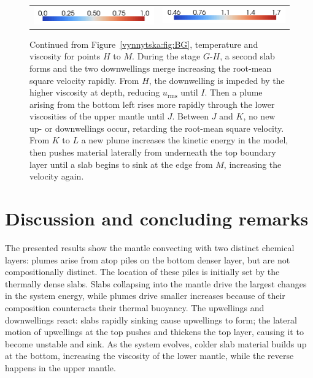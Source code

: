 \begin{figure}
\begin{center}
\begin{tabular}{c r}
\includegraphics[width=0.45\columnwidth]{chapters/vynnytska/png/tmleg.png} &
\includegraphics[width=0.45\columnwidth]{chapters/vynnytska/png/visleg.png}
\end{tabular}
\end{center}
\label{vynnytska:fig:HM}
\caption{Continued from Figure~\ref{vynnytska:fig:BG}, temperature and
  viscosity for points $H$ to $M$. During the stage $G$-$H$, a second
  slab forms and the two downwellings merge increasing the root-mean
  square velocity rapidly. From $H$, the downwelling is impeded by the
  higher viscosity at depth, reducing $u_{\mathrm{rms}}$ until $I$. Then a
  plume arising from the bottom left rises more rapidly through the
  lower viscosities of the upper mantle until $J$. Between $J$ and
  $K$, no new up- or downwellings occur, retarding the root-mean
  square velocity. From $K$ to $L$ a new plume increases the kinetic
  energy in the model, then pushes material laterally from underneath
  the top boundary layer until a slab begins to sink at the edge from
  $M$, increasing the velocity again.}
\end{figure}


\section{Discussion and concluding remarks}

The presented results show the mantle convecting with two distinct
chemical layers: plumes arise from atop piles on the bottom denser layer,
but are not compositionally distinct. The location of these piles is
initially set by the thermally dense slabs. Slabs collapsing into the
mantle drive the largest changes in the system energy, while plumes
drive smaller increases because of their composition counteracts their
thermal buoyancy. The upwellings and downwellings react: slabs rapidly
sinking cause upwellings to form; the lateral motion of upwellings at
the top pushes and thickens the top layer, causing it to become unstable
and sink. As the system evolves, colder slab material builds up at the
bottom, increasing the viscosity of the lower mantle, while the reverse
happens in the upper mantle.

